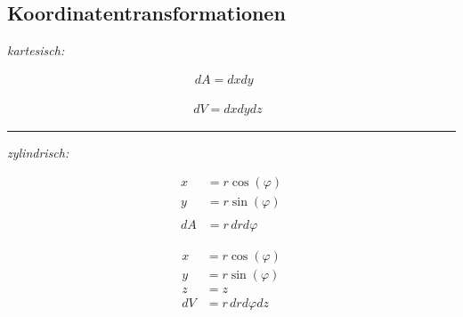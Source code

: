 \subsection{Koordinatentransformationen}
    \begin{center}
        \textit{kartesisch:}
    \end{center}
    \begin{minipage}{0.49\linewidth}\vspace{-1em}
        \begin{align*}
            dA = dxdy \phantom{ml}
        \end{align*}
    \end{minipage}
    \begin{minipage}{0.49\linewidth}\vspace{-1em}
        \begin{align*}
            dV = dxdydz \phantom{ll}
        \end{align*}
    \end{minipage}

    \hrule
    \begin{center}
        \textit{zylindrisch:}
    \end{center}\vspace{-0.25em}
    \begin{minipage}{0.49\linewidth}\vspace{-1em}
        \begin{align*}
            x &= r \cos(\varphi)\\
            y &= r \sin(\varphi)\\\\[0.25em]
            dA &= r \, drd\varphi
        \end{align*}
    \end{minipage}
    \begin{minipage}{0.49\linewidth}\vspace{-1em}
        \begin{align*}
            x &= r \cos(\varphi)\\
            y &= r \sin(\varphi)\\
            z &= z\\[0.25em]
            dV &= r \, drd\varphi dz
        \end{align*}
    \end{minipage}\vspace{0.5em}

